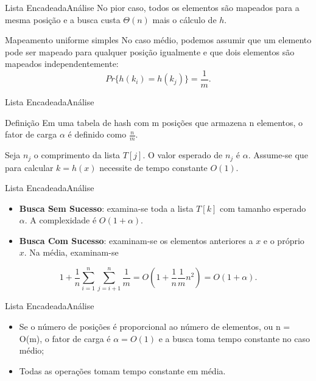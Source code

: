 \documentclass[aspectratio=169]{beamer}
\begin{document}
\begin{frame}{Lista Encadeada}{Análise}
No pior caso, todos os elementos são mapeados para a mesma posição e a busca custa $\Theta(n)$ mais o cálculo de $h$.
\begin{block}{Mapeamento uniforme simples}
No caso médio, podemos assumir que um elemento pode ser mapeado para qualquer posição igualmente e que dois elementos são mapeados independentemente:
\begin{equation}
Pr\{h(k_i) = h(k_j )\} = \frac{1}{m}. \nonumber
\end{equation}
\end{block}
\end{frame}

\begin{frame}{Lista Encadeada}{Análise}
\begin{block}{Definição}
Em uma tabela de hash com m posições que armazena n elementos, o fator de carga $\alpha$ é definido como $\frac{n}{m}$.
\end{block}
Seja $n_j$ o comprimento da lista $T [j]$. O valor esperado de $n_j$ é $\alpha$. Assume-se que para calcular $k = h(x)$ necessite de tempo constante $O(1)$.
\end{frame}

\begin{frame}{Lista Encadeada}{Análise}
\begin{itemize}
 \item {\bf Busca Sem Sucesso}: examina-se toda a lista $T [k]$ com tamanho esperado $\alpha$. A complexidade é $O(1 + \alpha)$.
 \item {\bf Busca Com Sucesso}: examinam-se os elementos anteriores a $x$ e o próprio $x$. Na média, examinam-se
\end{itemize}
 \begin{equation}
  1+ \frac{1}{n} \sum^{n}_{i=1} \sum^{n}_{j=i+1} \frac{1}{m} = O (1 + \frac{1}{n} \frac{1}{m} n^2) = O (1 + \alpha). \nonumber
 \end{equation}

\end{frame}


\begin{frame}{Lista Encadeada}{Análise}
\begin{itemize}
 \item Se o número de posições é proporcional ao número de elementos, ou n = O(m), o fator de carga é $\alpha = O(1)$ e a busca toma tempo constante no caso médio;
 \item Todas as operações tomam tempo constante em média.
\end{itemize}
\end{frame}
\end{document}
